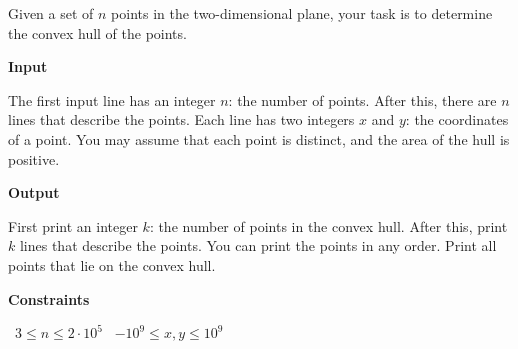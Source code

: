 Given a set of $n$ points in the two-dimensional plane, your task is to determine the convex hull of the points.

\vspace{0.3cm}\noindent\textbf{Input}

The first input line has an integer $n$: the number of points.
After this, there are $n$ lines that describe the points. Each line has two integers $x$ and $y$: the coordinates of a point.
You may assume that each point is distinct, and the area of the hull is positive.

\vspace{0.3cm}\noindent\textbf{Output}

First print an integer $k$: the number of points in the convex hull.
After this, print $k$ lines that describe the points. You can print the points in any order. Print all points that lie on the convex hull.

\vspace{0.3cm}\noindent\textbf{Constraints}

\textbullet\ $3 \le n \le 2 \cdot 10^5$
\textbullet\ $-10^9 \le x, y \le 10^9$